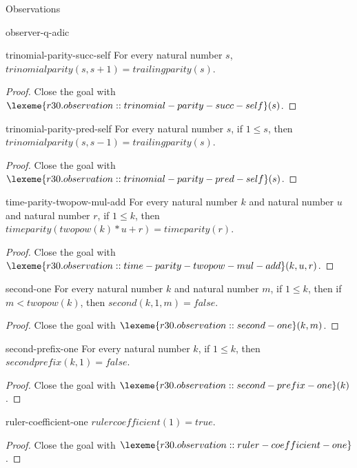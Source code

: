 \begin{lexlean}{Observations}
\begin{section}{observer-q-adic}
\begin{theorem}{trinomial-parity-succ-self}
For every natural number \(s\), \(trinomialparity(s, s + 1) = trailingparity(s)\).
\begin{proof}
Close the goal with \(\lexeme{r30.observation::trinomial-parity-succ-self}(s)\).
\end{proof}
\end{theorem}

\begin{theorem}{trinomial-parity-pred-self}
For every natural number \(s\), if \(1 ≤ s\), then \(trinomialparity(s, s - 1) = trailingparity(s)\).
\begin{proof}
Close the goal with \(\lexeme{r30.observation::trinomial-parity-pred-self}(s)\).
\end{proof}
\end{theorem}

\begin{theorem}{time-parity-twopow-mul-add}
For every natural number \(k\) and natural number \(u\) and natural number \(r\), if \(1 ≤ k\), then \(timeparity(twopow(k) * u + r) = timeparity(r)\).
\begin{proof}
Close the goal with \(\lexeme{r30.observation::time-parity-twopow-mul-add}(k, u, r)\).
\end{proof}
\end{theorem}

\begin{theorem}{second-one}
For every natural number \(k\) and natural number \(m\), if \(1 ≤ k\), then if \(m < twopow(k)\), then \(second(k, 1, m) = false\).
\begin{proof}
Close the goal with \(\lexeme{r30.observation::second-one}(k, m)\).
\end{proof}
\end{theorem}

\begin{theorem}{second-prefix-one}
For every natural number \(k\), if \(1 ≤ k\), then \(secondprefix(k, 1) = false\).
\begin{proof}
Close the goal with \(\lexeme{r30.observation::second-prefix-one}(k)\).
\end{proof}
\end{theorem}

\begin{theorem}{ruler-coefficient-one}
\(rulercoefficient(1) = true\).
\begin{proof}
Close the goal with \(\lexeme{r30.observation::ruler-coefficient-one}\).
\end{proof}
\end{theorem}


\end{section}
\end{lexlean}
